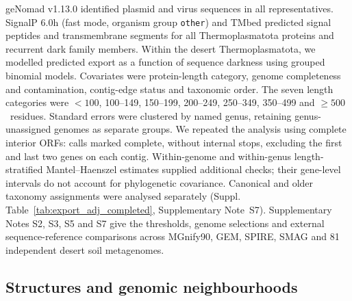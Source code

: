 \documentclass[11pt]{article}
\begin{document}
geNomad v1.13.0 \citep{camargo2024genomad} identified plasmid and virus sequences in all representatives. SignalP 6.0h \citep{teufel2022signalp6} (fast mode, organism group \texttt{other}) and TMbed \citep{bernhofer2022tmbed} predicted signal peptides and transmembrane segments for all Thermoplasmatota proteins and recurrent dark family members. Within the desert Thermoplasmatota, we modelled predicted export as a function of sequence darkness using grouped binomial models. Covariates were protein-length category, genome completeness and contamination, contig-edge status and taxonomic order. The seven length categories were $<100$, 100--149, 150--199, 200--249, 250--349, 350--499 and $\geq 500$~residues. Standard errors were clustered by named genus, retaining genus-unassigned genomes as separate groups. We repeated the analysis using complete interior ORFs: calls marked complete, without internal stops, excluding the first and last two genes on each contig. Within-genome and within-genus length-stratified Mantel--Haenszel estimates supplied additional checks; their gene-level intervals do not account for phylogenetic covariance. Canonical and older taxonomy assignments were analysed separately (Suppl. Table~\ref{tab:export_adj_completed}, Supplementary Note~S7). Supplementary Notes S2, S3, S5 and S7 give the thresholds, genome selections and external sequence-reference comparisons across MGnify90, GEM, SPIRE, SMAG and 81 independent desert soil metagenomes.

\subsection*{Structures and genomic neighbourhoods}
\end{document}
